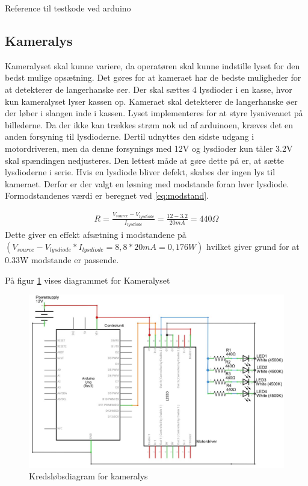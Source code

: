 Reference til testkode ved arduino 
 
 \subsection{Kameralys}
 \label{subsec:kameralys}
 Kameralyset skal kunne variere, da operatøren skal kunne indstille lyset for den bedst mulige opsætning. Det gøres for at kameraet har de bedste muligheder for at detekterer de langerhanske øer. Der skal sættes 4 lysdioder i en kasse, hvor kun kameralyset lyser kassen op. Kameraet skal detekterer de langerhanske øer der løber i slangen inde i kassen. Lyset implementeres for at styre lysniveauet på billederne. Da der ikke kan trækkes strøm nok ud af arduinoen, kræves det en anden forsyning til lysdioderne. Dertil udnyttes den sidste udgang i motordriveren, men da denne forsynings med 12V og lysdioder kun tåler 3.2V skal spændingen nedjusteres. Den lettest måde at gøre dette på er, at sætte lysdioderne i serie. Hvis en lysdiode bliver defekt, skabes der ingen lys til kameraet. Derfor er der valgt en løsning med modstande foran hver lysdiode. Formodstandenes værdi er beregnet ved \ref{eq:modstand}. 

\begin{align}
R=\frac{V_{source}-V_{lysdiode}}{I_{lysdiode}}=\frac{12-3.2}{20mA}=440\Omega
\label{eq:modstand}
\end{align} 
Dette giver en effekt afsætning i modstandene på $(V_{source}-V_{lysdiode}*I_{lysdiode}=8,8*20mA=0,176W)$ hvilket giver grund for at 0.33W modstande er passende.

På figur \ref{fig:LEDdiagram} vises diagrammet for Kameralyset
 
 \begin{figure}[H]
	\centering
	\includegraphics[width=1\textwidth]{billeder/Hardware/diagrammer/LEDdiagram.JPG}
	\caption{Kredsløbsdiagram for kameralys}
	\label{fig:LEDdiagram}
\end{figure} 

